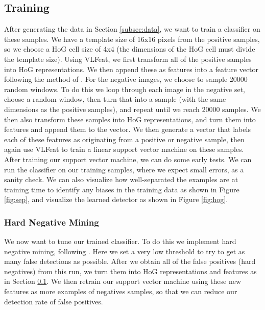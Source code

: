 \documentclass[twocolumn,longauthor]{aastex61}
\begin{document}
\subsection{Training} \label{subsec:training}
\noindent After generating the data in Section \ref{subsec:data}, we want to train a classifier on these samples. We have a template size of 16x16 pixels from the positive samples, so we choose a HoG cell size of 4x4 (the dimensions of the HoG cell must divide the template size). Using VLFeat, we first transform all of the positive samples into HoG representations. We then append these as features into a feature vector following the method of \citet{2009IEEE}. For the negative images, we choose to sample 20000 random windows. To do this we loop through each image in the negative set, choose a random window, then turn that into a sample (with the same dimensions as the positive samples), and repeat until we reach 20000 samples. We then also transform these samples into HoG representations, and turn them into features and append them to the vector. We then generate a vector that labels each of these features as originating from a positive or negative sample, then again use VLFeat to train a linear support vector machine on these samples.\\
\indent After training our support vector machine, we can do some early tests. We can run the classifier on our training samples, where we expect small errors, as a sanity check. We can also visualize how well-separated the examples are at training time to identify any biases in the training data as shown in Figure \ref{fig:sep}, and visualize the learned detector as shown in Figure \ref{fig:hog}.

\subsubsection{Hard Negative Mining} \label{subsubsec:mining}
\noindent We now want to tune our trained classifier. To do this we implement hard negative mining, following \citet{2005CVPR}. Here we set a very low threshold to try to get as many false detections as possible. After we obtain all of the false positives (hard negatives) from this run, we turn them into HoG representations and features as in Section \ref{subsec:training}. We then retrain our support vector machine using these new features as more examples of negatives samples, so that we can reduce our detection rate of false positives. 
\end{document}
